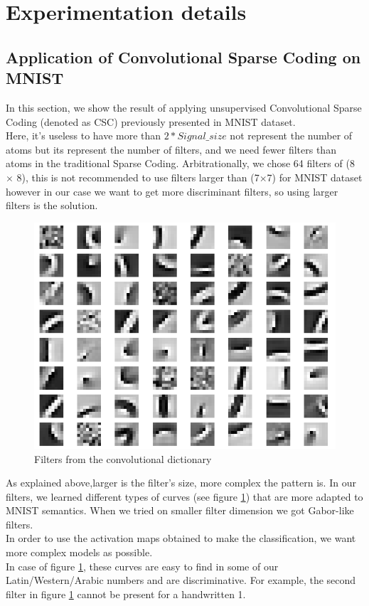\section{Experimentation details}
\subsection*{Application of Convolutional Sparse Coding on MNIST}
In this section, we show the result of applying unsupervised Convolutional Sparse Coding (denoted as CSC) previously presented in MNIST dataset.\\
Here, it's useless to have more than $2* Signal\_size$ not represent the number of atoms but its represent the number of filters, and we need fewer filters than atoms in the traditional Sparse Coding. Arbitrationally, we chose 64 filters of (8 $\times$ 8), this is not recommended to use filters larger than (7$\times$7) for MNIST dataset  \cite{best-practices-for-convolutional-neural-networks-applied-to-visual-document-analysis} however in our case we want to get more discriminant filters, so using larger filters is the solution.\\

\begin{figure}[h]
 \centering
 \includegraphics[scale=1]{CSC_D.png}
 \caption{Filters from the convolutional dictionary}
 \label{fig:CSC_D}
\end{figure}
As explained above,larger is the filter's size, more complex the pattern is. In our filters, we learned different types of curves (see figure \ref{fig:CSC_D}) that are more adapted to MNIST semantics. When we tried on smaller filter dimension we got  Gabor-like filters.\\
In order to use the activation maps obtained to make the classification, we want more complex models as possible. \\
In case of figure \ref{fig:CSC_D}, these curves are easy to find in some of our Latin/Western/Arabic numbers and are discriminative. For example, the second filter in figure \ref{fig:CSC_D} cannot be present for a handwritten 1.\\


